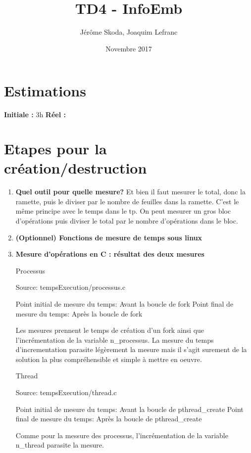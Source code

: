 \documentclass[12pt]{article}
\title{TD4 - InfoEmb}
\author{Jérôme Skoda, Joaquim Lefranc}
\date{Novembre 2017}
\begin{document}
\maketitle

\section{Estimations}
\textbf{Initiale :} 3h
\textbf{Réel :}

\section{Etapes pour la création/destruction}
\begin{enumerate}
	\item{\textbf{Quel outil pour quelle mesure?}}
		\newline
		Et bien il faut mesurer le total, donc la ramette, puis le diviser par le nombre de feuilles dans la ramette. C'est le même principe avec le temps dans le tp. On peut mesurer un gros bloc d'opérations puis diviser le total par le nombre d'opérations dans le bloc.
		\newline

	\item{\textbf{(Optionnel) Fonctions de mesure de temps sous linux}}
		\newline

	\item{\textbf{Mesure d'opérations en C : résultat des deux mesures}}
		\newline

		Processus

		Source: tempsExecution/processus.c

		Point initial de mesure du temps: Avant la boucle de fork
		Point final de mesure du temps: Après la boucle de fork

    Les mesures prennent le temps de création d'un fork ainsi que l'incrémentation
	  de la variable n\_processus. La mesure du temps d'incrementation parasite
		légèrement la mesure mais il s'agit surement de la solution la plus
		compréhensible et simple à mettre en oeuvre.

    Thread

		Source: tempsExecution/thread.c

    Point initial de mesure du temps: Avant la boucle de pthread\_create
		Point final de mesure du temps: Après la boucle de pthread\_create

    Comme pour la messure des processus, l'incrémentation de la variable
		n\_thread parasite la mesure.



\end{enumerate}
\end{document}
